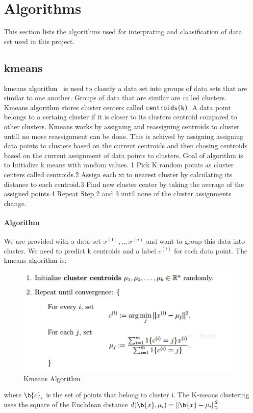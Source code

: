 \section{Algorithms}
This section lists the algorithms used for interprating and
claasification of data set used in this project.

\subsection{kmeans}

kmeans algorithm~\cite{hid-sp18-413-kmeans} is used to classify a data
set into groups of data sets that are similar to one another. Groups
of data that are similar are called clusters. Kmeans algorithm stores
cluster centers called \verb|centroids(k)|. A data point belongs to a
certaing cluster if it is closer to its clusters centroid compared to
other clusters.  Kmeans works by assigning and reassigning centroids
to cluster untill no more reassignment can be done. This is achived by
assigning assigning data points to clusters based on the current
centroids and then chosing centroids based on the current assignment
of data points to clusters. Goal of algorithm is to Initialize k means
with random values. 1 Pick K random points as cluster centers called
centroids.2 Assign each xi to nearest cluster by calculating its
distance to each centroid.3 Find new cluster center by taking the
average of the assigned points.4 Repeat Step 2 and 3 until none of the
cluster assignments change.
\paragraph{Algorithm}
We are provided with a data set ${x^{(1)}, .. , x^{(n)}}$ and want
to group this data into cluster. We need to predict k centroids and a
label $c^{(i)}$ for each data point. The kmeans algorithm is:

\begin{figure}[!ht]
	\centering\includegraphics[width=\columnwidth]{images/kmeans.png}
	 \caption{Kmeans Algorithm}\label{f:kmeans}
\end{figure}
where $\b{c}_i$ is the set of points that belong to cluster i. The
K-means clustering uses the square of the Euclidean distance
$d(\b{x},\mu_i) = \left\Vert \b{x}-\mu_i \right\Vert_2^2$ 

